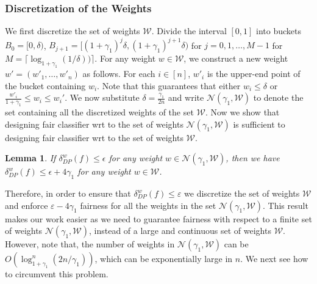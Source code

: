 \documentclass{article}
\newtheorem{lemma}{Lemma}
\newcommand{\ceil}[1]{\lceil #1 \rceil}
\newcommand{\WW}{\mathcal{W}}
\newcommand{\Nc}{\mathcal{N}}
\newcommand{\eps}{\varepsilon}
\begin{document}
\subsubsection{Discretization of the Weights}
We first discretize the set of weights $\WW$. Divide the interval $[0,1]$ into buckets $B_0 = [0,\delta)$, $B_{j+1} = [(1+\gamma_1)^j \delta, (1+\gamma_1)^{j+1}\delta)$ for $j=0,1,\ldots,M-1$ for $M = \ceil{\log_{1+\gamma_1}(1/\delta) )}$. For any weight $w\in \WW$, we construct a new weight $w' = (w'_1,\ldots,w'_n)$ as follows. For each $i \in [n]$, $w'_i$ is the upper-end point of the bucket containing $w_i$. Note that this guarantees that either $w_i\le \delta$ or $\frac{w'_i}{1+\gamma_1} \le w_i \le w_i'$. We now substitute $\delta = \frac{\gamma_1}{2n}$ and write $\Nc(\gamma_1,\WW)$ to denote the set containing all the discretized weights of the set $\WW$.  Now we show that designing fair classifier wrt to the set of weights $\Nc(\gamma_1,\WW)$ is sufficient to designing fair classifier wrt to the set of weights $\WW$. 
\begin{lemma}
If $\delta^w_{DP}(f) \le \epsilon$ for any weight $w \in \Nc(\gamma_1,\WW)$, then we have $\delta^w_{DP}(f) \le \epsilon + 4\gamma_1$ for any weight $w \in \WW$.
\end{lemma}
 Therefore, in order to ensure that $\delta^w_{DP}(f) \le \eps$ we discretize the set of weights $\WW$ and enforce $\eps-4\gamma_1$ fairness for all the weights in the set $\Nc(\gamma_1,\WW)$. This result makes our work easier as we need to guarantee fairness with respect to a finite set of weights $\Nc(\gamma_1,\WW)$, instead of a large and continuous set of weights $\WW$. However, note that, the number of weights in $\Nc(\gamma_1,\WW)$ can be $O\left( \log^n_{1+\gamma_1}(2n/\gamma_1)\right)$, which can be exponentially large in $n$. We next see how to circumvent this problem.
\end{document}
